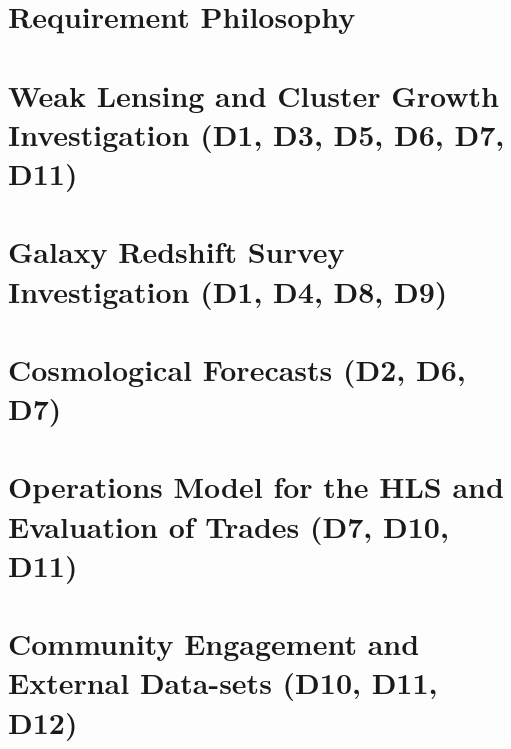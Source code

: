 \documentclass[letter]{ar-1col_WFIRST-HLS}
\begin{document}
\section{Requirement Philosophy}
\label{sec:reqt_philosophy}


\section{Weak Lensing and Cluster Growth Investigation (D1, D3, D5, D6, D7, D11)}
\label{sec:wl_gal-clusters}


\section{Galaxy Redshift Survey Investigation (D1, D4, D8, D9)}
\label{sec:gc}


\section{Cosmological Forecasts (D2, D6, D7)}
\label{sec:forecast}


\section{Operations Model for the HLS and Evaluation of Trades (D7, D10, D11)}
\label{sec:operation}


\section{Community Engagement and External Data-sets (D10, D11, D12)}
\label{sec:engagement}

\end{document}
